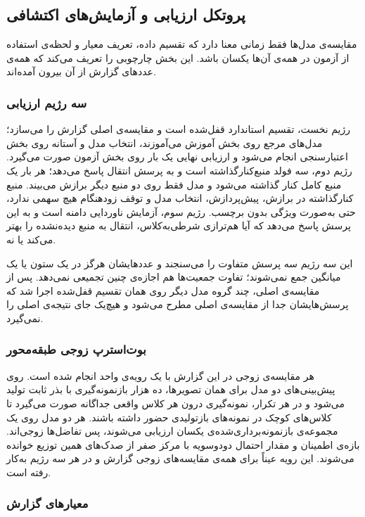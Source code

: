 \subsection{پروتکل ارزیابی و آزمایش‌های اکتشافی}

مقایسه‌ی مدل‌ها فقط زمانی معنا دارد که تقسیم داده، تعریف معیار و لحظه‌ی استفاده از آزمون در همه‌ی آن‌ها یکسان باشد. این بخش چارچوبی را تعریف می‌کند که همه‌ی عددهای گزارش از آن بیرون آمده‌اند.

\subsubsection{سه رژیم ارزیابی}

رژیم نخست، تقسیم استاندارد قفل‌شده است و مقایسه‌ی اصلی گزارش را می‌سازد؛ مدل‌های مرجع روی بخش آموزش می‌آموزند، انتخاب مدل و آستانه روی بخش اعتبارسنجی انجام می‌شود و ارزیابی نهایی یک بار روی بخش آزمون صورت می‌گیرد. رژیم دوم، سه فولد منبع‌کنارگذاشته است و به پرسش انتقال پاسخ می‌دهد؛ هر بار یک منبع کامل کنار گذاشته می‌شود و مدل فقط روی دو منبع دیگر برازش می‌بیند. منبع کنارگذاشته در برازش، پیش‌پردازش، انتخاب مدل و توقف زودهنگام هیچ سهمی ندارد، حتی به‌صورت ویژگی بدون برچسب. رژیم سوم، آزمایش ناوردایی دامنه است و به این پرسش پاسخ می‌دهد که آیا هم‌ترازی شرطی‌به‌کلاس، انتقال به منبع دیده‌نشده را بهتر می‌کند یا نه.

این سه رژیم سه پرسش متفاوت را می‌سنجند و عددهایشان هرگز در یک ستون یا یک میانگین جمع نمی‌شوند؛ تفاوت جمعیت‌ها هم اجازه‌ی چنین تجمیعی نمی‌دهد. پس از مقایسه‌ی اصلی، چند گروه مدل دیگر روی همان تقسیم قفل‌شده اجرا شد که پرسش‌هایشان جدا از مقایسه‌ی اصلی مطرح می‌شود و هیچ‌یک جای نتیجه‌ی اصلی را نمی‌گیرد.

\subsubsection{بوت‌استرپ زوجی طبقه‌محور}

هر مقایسه‌ی زوجی در این گزارش با یک رویه‌ی واحد انجام شده است. روی پیش‌بینی‌های دو مدل برای همان تصویرها، ده هزار بازنمونه‌گیری با بذر ثابت تولید می‌شود و در هر تکرار، نمونه‌گیری درون هر کلاس واقعی جداگانه صورت می‌گیرد تا کلاس‌های کوچک در نمونه‌های بازتولیدی حضور داشته باشند. هر دو مدل روی یک مجموعه‌ی بازنمونه‌برداری‌شده‌ی یکسان ارزیابی می‌شوند، پس تفاضل‌ها زوجی‌اند. بازه‌ی اطمینان و مقدار احتمال دودوسویه با مرکز صفر از صدک‌های همین توزیع خوانده می‌شوند. این رویه عیناً برای همه‌ی مقایسه‌های زوجی گزارش و در هر سه رژیم به‌کار رفته است.

\subsubsection{معیارهای گزارش}

